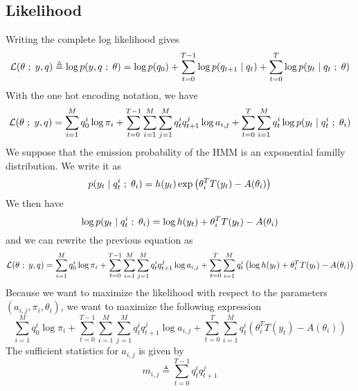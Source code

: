 \documentclass[a4paper, 11pt]{article}
\newcommand{\eqdef}{\triangleq}
\newcommand{\ssemi}{\hspace{.3em};\hspace{.3em}}
\begin{document}
\subsection{Likelihood}

Writing the complete log likelihood gives
\begin{displaymath}
  \mathcal{L}(\theta \ssemi y, q) \eqdef \log{p(y, q \ssemi \theta)} = \log{p(q_0)} + \sum_{t = 0}^{T-1} \log{p(q_{t+1} \mid q_t)} + \sum_{t = 0}^{T} \log{ p(y_t \mid q_t \ssemi \theta) }
\end{displaymath}
With the one hot encoding notation, we have
\begin{displaymath}
  \mathcal{L}(\theta \ssemi y, q)
  = \sum_{i = 1}^{M} q_0^i \log{\pi_i}
  + \sum_{t = 0}^{T-1} \sum_{i = 1}^{M} \sum_{j = 1}^{M} q_t^i q_{t+1}^j \log{a_{i,j}}
  + \sum_{t = 0}^{T} \sum_{i = 1}^{M} q_t^i \log{ p(y_t \mid q_t^i \ssemi \theta_i) }
\end{displaymath}
We suppose that the emission probability of the HMM is an exponential
familly distribution. We write it as
\begin{displaymath}
  \label{exp-form}
  p(y_t \mid q_t^i \ssemi \theta_i) = h(y_t) \exp{\left(\theta_i^T T(y_t) - A(\theta_i)\right)}
\end{displaymath}
We then have
\begin{displaymath}
  \label{log-exp-form}
  \log{ p(y_t \mid q_t^i \ssemi \theta_i) } = \log{h(y_t)} + \theta_i^T T(y_t) - A(\theta_i)
\end{displaymath}
and we can rewrite the previous equation as
\begin{displaymath}
  \mathcal{L}(\theta \ssemi y, q)
  = \sum_{i = 1}^{M} q_0^i \log{\pi_i}
  + \sum_{t = 0}^{T-1} \sum_{i = 1}^{M} \sum_{j = 1}^{M} q_t^i q_{t+1}^j \log{a_{i,j}}
  + \sum_{t = 0}^{T} \sum_{i = 1}^{M} q_t^i \left( \log{h(y_t)} + \theta_i^T T(y_t) - A(\theta_i)\right)
\end{displaymath}
Because we want to maximize the likelihood with respect to the
parameters $(a_{i,j}, \pi_i, \theta_i)$, we want to maximize the
following expression
\begin{displaymath}
  \sum_{i = 1}^{M} q_0^i \log{\pi_i}
  + \sum_{t = 0}^{T-1} \sum_{i = 1}^{M} \sum_{j = 1}^{M} q_t^i q_{t+1}^j \log{a_{i,j}}
  + \sum_{t = 0}^{T} \sum_{i = 1}^{M} q_t^i \left(\theta_i^T T(y_t) - A(\theta_i)\right)
\end{displaymath}
The sufficient statistics for $a_{i,j}$ is given by
\begin{displaymath}
  m_{i, j} \eqdef \sum_{t = 0}^{T-1} q_t^i q_{t+1}^j
\end{displaymath}
\end{document}

